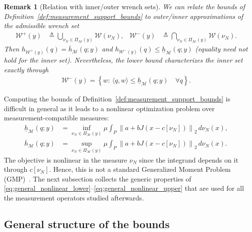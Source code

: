\documentclass[11pt,a4paper]{article}
\theoremstyle{plain}
\newtheorem{remark}[theorem]{Remark}
\begin{document}
\begin{remark}[Relation with inner/outer wrench sets]
    \label{rem:inner_outer}
    We can relate the bounds of Definition~\ref{def:measurement_support_bounds} to outer/inner approximations of the admissible wrench set
    \begin{align}
        \mathcal W^+(y)
        &\triangleq
        \bigcup_{\nu_N\in\Pi_{\mathcal M}(y)}\mathcal W(\nu_N),
        &
        \mathcal W^-(y)
        &\triangleq
        \bigcap_{\nu_N\in\Pi_{\mathcal M}(y)}\mathcal W(\nu_N).
        \end{align}
    Then $h_{\mathcal W^+(y)}(q) =\overline h_{\mathcal M}(q;y)$ and $h_{\mathcal W^-(y)}(q) \le\underline h_{\mathcal M}(q;y)$ (equality need not hold for the inner set). Nevertheless, the lower bound characterizes the inner set exactly through
    \begin{align}
        \mathcal W^-(y)
        =
        \left\{
        w:\,
        \langle q,w\rangle
        \le
        \underline h_{\mathcal M}(q;y)
        \quad \forall q
        \right\}.
    \end{align}
\end{remark}

Computing the bounds of Definition~\ref{def:measurement_support_bounds} is difficult in general as it leads to a nonlinear optimization problem over measurement-compatible measures:
\begin{align}
    \underline h_{\mathcal M}(q;y)
    &=
    \inf_{\nu_N\in\Pi_{\mathcal M}(y)}
    \mu
    \int_P
    \left\|
    a+bJ\left(
    x-
    c[\nu_N]
    \right)
    \right\|_2
    \,d\nu_N(x),
    \label{eq:general_nonlinear_lower}
    \\
    \overline h_{\mathcal M}(q;y)
    &=
    \sup_{\nu_N\in\Pi_{\mathcal M}(y)}
    \mu
    \int_P
    \left\|
    a+bJ\left(
    x-
    c[\nu_N]
    \right)
    \right\|_2
    \,d\nu_N(x).
    \label{eq:general_nonlinear_upper}
\end{align}
The objective is nonlinear in the measure $\nu_N$ since the integrand depends
on it through $c[\nu_N]$. Hence, this is not a standard Generalized
Moment Problem (GMP)~\cite{lasserre2010moments}. The next subsection collects the
generic properties of \eqref{eq:general_nonlinear_lower}--\eqref{eq:general_nonlinear_upper}
that are used for all the measurement operators studied afterwards.

\subsection{General structure of the bounds}
\label{sec:general_structure}
\end{document}
